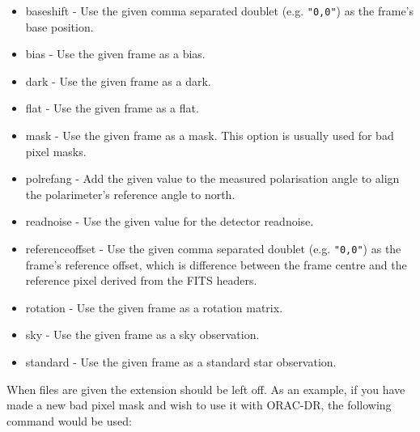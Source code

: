 \documentclass[twoside,11pt]{article}
\renewcommand{\_}{\texttt{\symbol{95}}}
\begin{document}
\begin{itemize}

\item 

baseshift - Use the given comma separated doublet (e.g. \texttt{"0,0"})
as the frame's base position.


\item 

bias - Use the given frame as a bias.


\item 

dark - Use the given frame as a dark.


\item 

flat - Use the given frame as a flat.


\item 

mask - Use the given frame as a mask. This option is usually used
for bad pixel masks.


\item 

polrefang - Add the given value to the measured polarisation angle
to align the polarimeter's reference angle to north.


\item 

readnoise - Use the given value for the detector readnoise.


\item 

referenceoffset - Use the given comma separated doublet (e.g.
\texttt{"0,0"}) as the frame's reference offset, which is difference between
the frame centre and the reference pixel derived from the FITS
headers.


\item 

rotation - Use the given frame as a rotation matrix.


\item 

sky - Use the given frame as a sky observation.


\item 

standard - Use the given frame as a standard star observation.

\end{itemize}


When files are given the extension should be left off.  As an example,
if you have made a new bad pixel mask and wish to use it with ORAC-DR,
the following command would be used:
\end{document}
